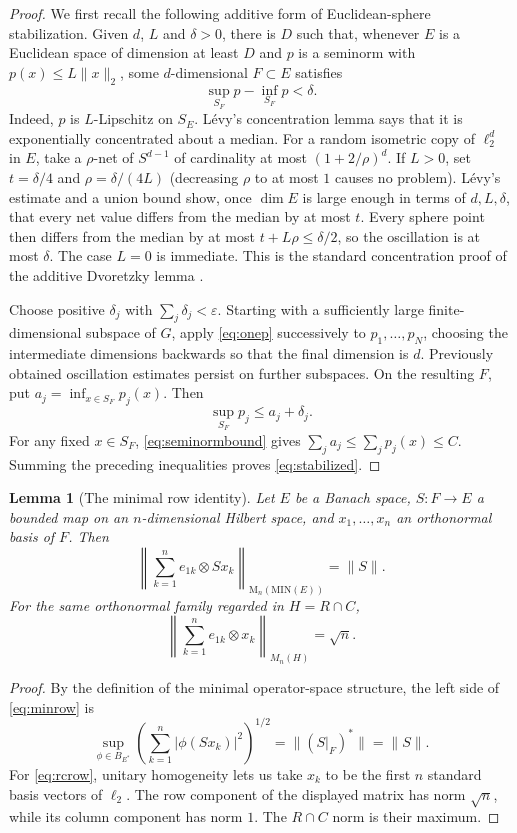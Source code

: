 \documentclass[11pt]{article}
\newtheorem{lemma}[theorem]{Lemma}
\newcommand{\MIN}{\mathrm{MIN}}
\newcommand{\M}{\mathrm M}
\begin{document}
\begin{proof}
We first recall the following additive form of Euclidean-sphere
stabilization.  Given $d$, $L$ and $\delta>0$, there is $D$ such that, whenever
$E$ is a Euclidean space of dimension at least $D$ and $p$ is a seminorm with
$p(x)\leq L\|x\|_2$, some $d$-dimensional $F\subset E$ satisfies
\[
 \sup_{S_F}p-\inf_{S_F}p<\delta. \tag{4}\label{eq:onep}
\]
Indeed, $p$ is $L$-Lipschitz on $S_E$.  L\'evy's concentration lemma says
that it is exponentially concentrated about a median.  For a random
isometric copy of $\ell_2^d$ in $E$, take a $\rho$-net of $S^{d-1}$ of
cardinality at most $(1+2/\rho)^d$.  If $L>0$, set
$t=\delta/4$ and $\rho=\delta/(4L)$ (decreasing $\rho$ to at most $1$ causes
no problem).  L\'evy's estimate and a union bound show, once $\dim E$ is large
enough in terms of $d,L,\delta$, that every net value differs from the median
by at most $t$.  Every sphere point then differs from the median by at most
$t+L\rho\leq\delta/2$, so the oscillation is at most $\delta$.  The case
$L=0$ is immediate.  This is the standard concentration proof of the additive
Dvoretzky lemma \cite[Chapter 2]{Ledoux}.

Choose positive $\delta_j$ with $\sum_j\delta_j<\varepsilon$.  Starting with
a sufficiently large finite-dimensional subspace of $G$, apply
\eqref{eq:onep} successively to $p_1,\ldots,p_N$, choosing the intermediate
dimensions backwards so that the final dimension is $d$.  Previously obtained
oscillation estimates persist on further subspaces.  On the resulting $F$,
put $a_j=\inf_{x\in S_F}p_j(x)$.  Then
\[
 \sup_{S_F}p_j\leq a_j+\delta_j.
\]
For any fixed $x\in S_F$, \eqref{eq:seminormbound} gives
$\sum_ja_j\leq\sum_jp_j(x)\leq C$.  Summing the preceding inequalities proves
\eqref{eq:stabilized}.
\end{proof}

\begin{lemma}[The minimal row identity]\label{lem:minrow}
Let $E$ be a Banach space, $S:F\to E$ a bounded map on an
$n$-dimensional Hilbert space, and $x_1,\ldots,x_n$ an orthonormal basis of
$F$.  Then
\[
 \left\|\sum_{k=1}^ne_{1k}\otimes Sx_k\right\|_{
 \M_n(\MIN(E))}=\|S\|.
 \tag{5}\label{eq:minrow}
\]
For the same orthonormal family regarded in $H=R\cap C$,
\[
 \left\|\sum_{k=1}^ne_{1k}\otimes x_k\right\|_{M_n(H)}=\sqrt n.
 \tag{6}\label{eq:rcrow}
\]
\end{lemma}

\begin{proof}
By the definition of the minimal operator-space structure, the left side of
\eqref{eq:minrow} is
\[
 \sup_{\phi\in B_{E^*}}
 \left(\sum_{k=1}^n|\phi(Sx_k)|^2\right)^{1/2}
 =\|(S|_F)^*\|=\|S\|.
\]
For \eqref{eq:rcrow}, unitary homogeneity lets us take $x_k$ to be the first
$n$ standard basis vectors of $\ell_2$.  The row component of the displayed
matrix has norm $\sqrt n$, while its column component has norm $1$.  The
$R\cap C$ norm is their maximum.
\end{proof}
\end{document}
